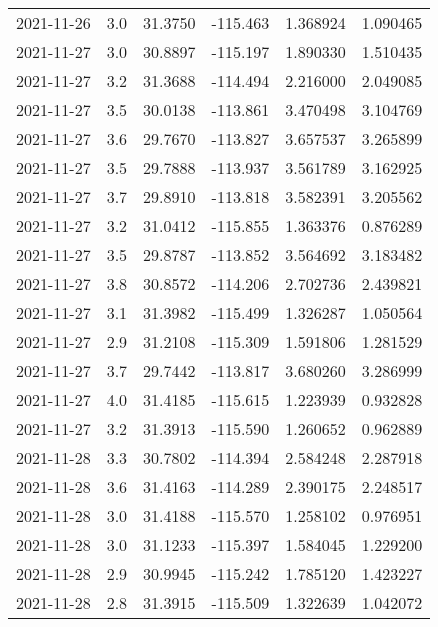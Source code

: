 \begin{tabular}{lrrrrr}
2021-11-26 &       3.0 &  31.3750 &  -115.463 &         1.368924 &         1.090465 \\
2021-11-27 &       3.0 &  30.8897 &  -115.197 &         1.890330 &         1.510435 \\
2021-11-27 &       3.2 &  31.3688 &  -114.494 &         2.216000 &         2.049085 \\
2021-11-27 &       3.5 &  30.0138 &  -113.861 &         3.470498 &         3.104769 \\
2021-11-27 &       3.6 &  29.7670 &  -113.827 &         3.657537 &         3.265899 \\
2021-11-27 &       3.5 &  29.7888 &  -113.937 &         3.561789 &         3.162925 \\
2021-11-27 &       3.7 &  29.8910 &  -113.818 &         3.582391 &         3.205562 \\
2021-11-27 &       3.2 &  31.0412 &  -115.855 &         1.363376 &         0.876289 \\
2021-11-27 &       3.5 &  29.8787 &  -113.852 &         3.564692 &         3.183482 \\
2021-11-27 &       3.8 &  30.8572 &  -114.206 &         2.702736 &         2.439821 \\
2021-11-27 &       3.1 &  31.3982 &  -115.499 &         1.326287 &         1.050564 \\
2021-11-27 &       2.9 &  31.2108 &  -115.309 &         1.591806 &         1.281529 \\
2021-11-27 &       3.7 &  29.7442 &  -113.817 &         3.680260 &         3.286999 \\
2021-11-27 &       4.0 &  31.4185 &  -115.615 &         1.223939 &         0.932828 \\
2021-11-27 &       3.2 &  31.3913 &  -115.590 &         1.260652 &         0.962889 \\
2021-11-28 &       3.3 &  30.7802 &  -114.394 &         2.584248 &         2.287918 \\
2021-11-28 &       3.6 &  31.4163 &  -114.289 &         2.390175 &         2.248517 \\
2021-11-28 &       3.0 &  31.4188 &  -115.570 &         1.258102 &         0.976951 \\
2021-11-28 &       3.0 &  31.1233 &  -115.397 &         1.584045 &         1.229200 \\
2021-11-28 &       2.9 &  30.9945 &  -115.242 &         1.785120 &         1.423227 \\
2021-11-28 &       2.8 &  31.3915 &  -115.509 &         1.322639 &         1.042072 \\

\end{tabular}
